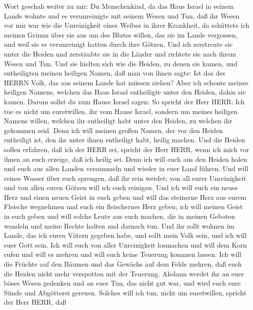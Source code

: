 Wort geschah weiter zu mir:  Du Menschenkind, da das Haus
Israel in seinem Lande wohnte und es verunreinigte mit seinem Wesen und
Tun, daß ihr Wesen vor mir war wie die Unreinigkeit eines Weibes in
ihrer Krankheit,  da schüttete ich meinen Grimm über sie
aus um des Blutes willen, das sie im Lande vergossen, und weil sie es
verunreinigt hatten durch ihre Götzen.  Und ich zerstreute
sie unter die Heiden und zerstäubte sie in die Länder und richtete sie
nach ihrem Wesen und Tun.  Und sie hielten sich wie die
Heiden, zu denen sie kamen, und entheiligten meinen heiligen Namen, daß
man von ihnen sagte: Ist das des HERRN Volk, das aus seinem Lande hat
müssen ziehen?  Aber ich schonte meines heiligen Namens,
welchen das Haus Israel entheiligte unter den Heiden, dahin sie kamen.
 Darum sollst du zum Hause Israel sagen: So spricht der
Herr HERR: Ich tue es nicht um euretwillen, ihr vom Hause Israel,
sondern um meines heiligen Namens willen, welchen ihr entheiligt habt
unter den Heiden, zu welchen ihr gekommen seid.  Denn ich
will meinen großen Namen, der vor den Heiden entheiligt ist, den ihr
unter ihnen entheiligt habt, heilig machen. Und die Heiden sollen
erfahren, daß ich der HERR sei, spricht der Herr HERR, wenn ich mich vor
ihnen an euch erzeige, daß ich heilig sei.  Denn ich will
euch aus den Heiden holen und euch aus allen Landen versammeln und
wieder in euer Land führen.  Und will reines Wasser über
euch sprengen, daß ihr rein werdet; von all eurer Unreinigkeit und von
allen euren Götzen will ich euch reinigen.  Und ich will
euch ein neues Herz und einen neuen Geist in euch geben und will das
steinerne Herz aus eurem Fleische wegnehmen und euch ein fleischernes
Herz geben;  ich will meinen Geist in euch geben und will
solche Leute aus euch machen, die in meinen Geboten wandeln und meine
Rechte halten und darnach tun.  Und ihr sollt wohnen im
Lande, das ich euren Vätern gegeben habe, und sollt mein Volk sein, und
ich will euer Gott sein.  Ich will euch von aller
Unreinigkeit losmachen und will dem Korn rufen und will es mehren und
will euch keine Teuerung kommen lassen.  Ich will die
Früchte auf den Bäumen und das Gewächs auf dem Felde mehren, daß euch
die Heiden nicht mehr verspotten mit der Teuerung.  Alsdann
werdet ihr an euer böses Wesen gedenken und an euer Tun, das nicht gut
war, und wird euch eure Sünde und Abgötterei gereuen. 
Solches will ich tun, nicht um euretwillen, spricht der Herr HERR, daß
